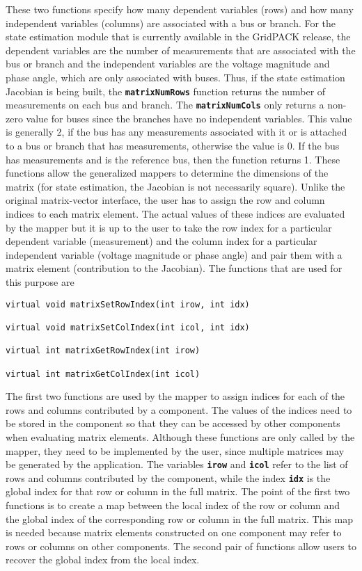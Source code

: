 These two functions specify how many dependent variables (rows) and how many independent variables (columns) are associated with a bus or branch. For the state estimation module that is currently available in the GridPACK release, the dependent variables are the  number of measurements that are associated with the bus or branch and the independent variables are the voltage magnitude and phase angle, which are only associated with buses. Thus, if the state estimation Jacobian is being built, the \texttt{\textbf{matrixNumRows}} function returns the number of measurements on each bus and branch. The \texttt{\textbf{matrixNumCols}} only returns a non-zero value for buses since the branches have no independent variables. This value is generally 2, if the bus has any measurements associated with it or is attached to a bus or branch that has measurements, otherwise the value is 0. If the bus has measurements and is the reference bus, then the function returns 1. These functions allow the generalized mappers to determine the dimensions of the matrix (for state estimation, the Jacobian is not necessarily square).
Unlike the original matrix-vector interface, the user has to assign the row and column indices to each matrix element. The actual values of these indices are evaluated by the mapper but it is up to the user to take the row index for a particular dependent variable (measurement) and the column index for a particular independent variable (voltage magnitude or phase angle) and pair them with a matrix element (contribution to the Jacobian). The functions that are used for this purpose are

{
\color{red}
\begin{Verbatim}[fontseries=b]
virtual void matrixSetRowIndex(int irow, int idx)

virtual void matrixSetColIndex(int icol, int idx)

virtual int matrixGetRowIndex(int irow)

virtual int matrixGetColIndex(int icol)
\end{Verbatim}
}

The first two functions are used by the mapper to assign indices for each of the rows and columns contributed by a component. The values of the indices need to be stored in the component so that they can be accessed by other components when evaluating matrix elements. Although these functions are only called by the mapper, they need to be implemented by the user, since multiple matrices may be generated by the application. The variables \texttt{\textbf{irow}} and \texttt{\textbf{icol}} refer to the list of rows and columns contributed by the component, while the index \texttt{\textbf{idx}} is the global index for that row or column in the full matrix. The point of the first two functions is to create a map between the local index of the row or column and the global index of the corresponding row or column in the full matrix. This map is needed because matrix elements constructed on one component may refer to rows or columns on other components. The second pair of functions allow users to recover the global index from the local index.


